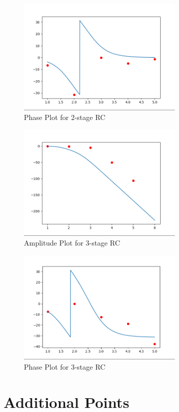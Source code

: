\documentclass{article}
\begin{document}
\begin{figure}[H]
    \centering
    \includegraphics[width=0.7\textwidth]{figs/phase_2cas.png}
    \caption{Phase Plot for 2-stage RC}
\end{figure}
\begin{figure}[H]
    \centering
    \includegraphics[width=0.7\textwidth]{figs/ampl_3cas.png}
    \caption{Amplitude Plot for 3-stage RC}
\end{figure}
\begin{figure}[H]
    \centering
    \includegraphics[width=0.7\textwidth]{figs/phase_3cas.png}
    \caption{Phase Plot for 3-stage RC}
\end{figure}
\section{Additional Points}
\end{document}
